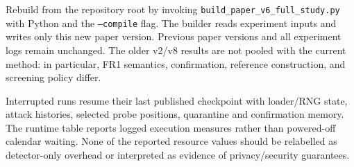 \documentclass[conference]{IEEEtran}
\begin{document}
Rebuild from the repository root by invoking
\texttt{build\_paper\_v6\_full\_study.py} with Python and the
\texttt{--compile} flag. The builder reads experiment inputs and writes only this new
paper version. Previous paper versions and all experiment logs remain unchanged.
The older v2/v8 results are not pooled with the current method: in particular,
FR1 semantics, confirmation, reference construction, and screening policy differ.

Interrupted runs resume their last published checkpoint with loader/RNG state,
attack histories, selected probe positions, quarantine and confirmation memory.
The runtime table reports logged execution measures rather than powered-off
calendar waiting. None of the reported resource values should be relabelled as
detector-only overhead or interpreted as evidence of privacy/security guarantees.

\FloatBarrier


\end{document}
